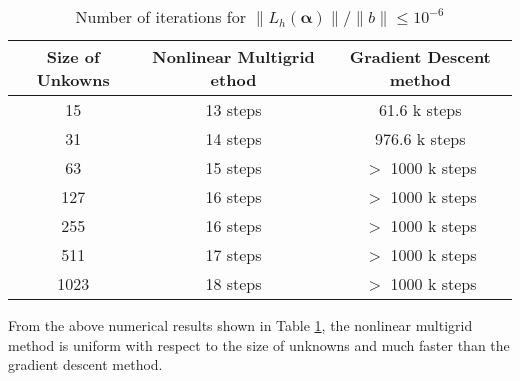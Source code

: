 \begin{table}\label{Table:nonliear}%
\begin{center}
\begin{tabular}{|c||c|c|}
\hline \hline
Size of Unkowns  & Nonlinear Multigrid  ethod  & Gradient Descent method \\ \hline\hline %
15       &   13 steps  &  61.6 k steps \\ \hline %
31      &   14 steps   &  976.6 k steps  \\ \hline %
63         &  15 steps & $>$ 1000 k steps\\ \hline %
127       & 16 steps & $>$ 1000 k steps \\ \hline %
255        & 16 steps & $>$ 1000 k steps \\ \hline %
511     &17 steps& $>$ 1000 k steps \\ \hline %
1023      &18 steps&$>$ 1000 k steps \\ \hline %
\end{tabular}
\caption{Number of iterations for $\| L_h({\bm \alpha}) \|/ \|b\| \leq 10^{-6}$}
\end{center}
\end{table}

From the above numerical results shown in Table \ref{Table:nonliear}, the nonlinear multigrid method is uniform with respect to the size of 
unknowns and much faster than the gradient descent method.  


\endinput
Following the FAS idea, we propose the next Algorithms \ref{alg:OD-FAS} to solve the \eqref{eq:rep}:
\begin{breakablealgorithm}
	\caption{$u = {\text{OD-FAS}}(f,J,m_1, \cdots, m_J)$}
	\label{alg:OD-FAS}
	\begin{algorithmic}
		\State Initialization
		$$
		u^{1,0} = f,
		$$
		\State Feature extraction between levels,
		\For{$\ell = 1:J$}
		\State Feature extraction during level $\ell$,
		\For{$i = 1:m_\ell$}
		\State 
		$$
		u^{\ell,i} = u^{\ell,i-1} +[\epsilon I + \nabla F^{\ell}(u^{\ell,i-1})]^{-1} (f^\ell - F^{\ell}(u^{\ell,i-1})).
		$$
		\EndFor
		\If{$\ell = J$}
		\State Return $u^{J,m_J}$.
		\EndIf
		\State Form initialization and right hand term in coarse level:
		$$
		u^{\ell+1,0}= R_\ell^{\ell+1} u^{\ell,m_\ell}, \quad 
		f^{\ell+1} = R_\ell^{\ell+1} (r^\ell - F^{\ell}(u^{\ell,m_\ell})) + F^{\ell+1}( u^{\ell+1, 0}).
		$$
		\EndFor
	\end{algorithmic}
\end{breakablealgorithm}


